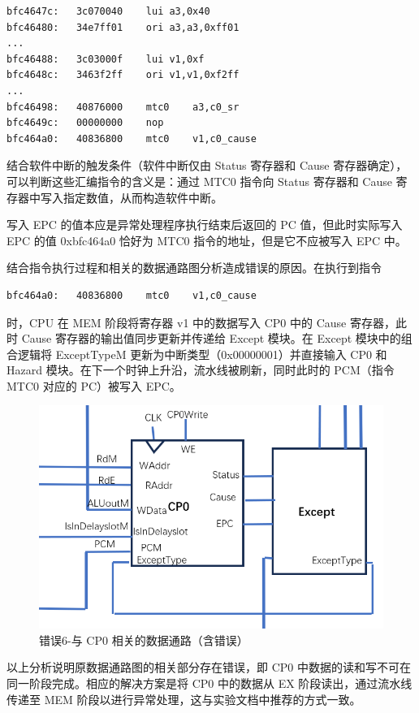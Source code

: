 \begin{enumerate}[(1)]
\begin{lstlisting}
bfc4647c:	3c070040 	lui	a3,0x40
bfc46480:	34e7ff01 	ori	a3,a3,0xff01
...
bfc46488:	3c03000f 	lui	v1,0xf
bfc4648c:	3463f2ff 	ori	v1,v1,0xf2ff
...
bfc46498:	40876000 	mtc0	a3,c0_sr
bfc4649c:	00000000 	nop
bfc464a0:	40836800 	mtc0	v1,c0_cause
\end{lstlisting}

结合软件中断的触发条件（软件中断仅由 Status 寄存器和 Cause 寄存器确定），可以判断这些汇编指令的含义是：通过 MTC0 指令向 Status 寄存器和 Cause 寄存器中写入指定数值，从而构造软件中断。

写入 EPC 的值本应是异常处理程序执行结束后返回的 PC 值，但此时实际写入 EPC 的值 0xbfc464a0 恰好为 MTC0 指令的地址，但是它不应被写入 EPC 中。

结合指令执行过程和相关的数据通路图分析造成错误的原因。在执行到指令

\begin{lstlisting}
bfc464a0:	40836800 	mtc0	v1,c0_cause
\end{lstlisting}

时，CPU 在 MEM 阶段将寄存器 v1 中的数据写入 CP0 中的 Cause 寄存器，此时 Cause 寄存器的输出值同步更新并传递给 Except 模块。在 Except 模块中的组合逻辑将 ExceptTypeM 更新为中断类型（0x00000001）并直接输入 CP0 和 Hazard 模块。在下一个时钟上升沿，流水线被刷新，同时此时的 PCM（指令 MTC0 对应的 PC）被写入 EPC。

\begin{figure}[H]
    \centering
    \includegraphics[width=\textwidth]{image/错误6-分析定位过程2.png}
    \caption{错误6-与 CP0 相关的数据通路（含错误）}
    \label{fig:错误6-分析定位过程2}
\end{figure}

以上分析说明原数据通路图的相关部分存在错误，即 CP0 中数据的读和写不可在同一阶段完成。相应的解决方案是将 CP0 中的数据从 EX 阶段读出，通过流水线传递至 MEM 阶段以进行异常处理，这与实验文档中推荐的方式一致。


\end{enumerate}
